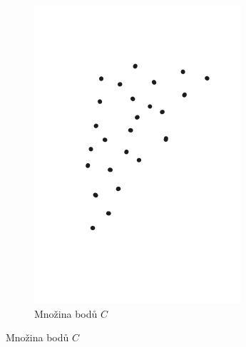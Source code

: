 \begin{figure}[h!]
    \centering
    \begin{subfigure}[b]{0.3\textwidth}
        \centering
        \includegraphics[width=\textwidth]{img/points_for_cone_hull.png}
        \caption{Množina bodů $C$}
        \label{fig:cone_hull:a}
    \end{subfigure}

    \hfill


\end{figure}
